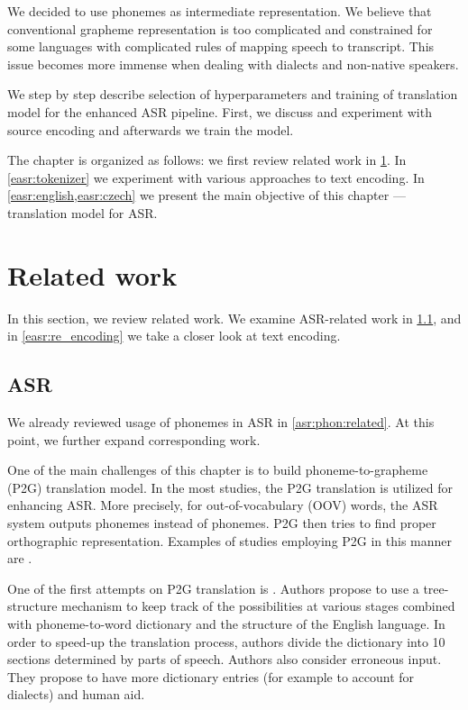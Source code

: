 We decided to use phonemes as intermediate representation. We believe that conventional grapheme representation is too complicated and constrained for some languages with complicated rules of mapping speech to transcript. This issue becomes more immense when dealing with dialects and non-native speakers.

We step by step describe selection of hyperparameters and training of translation model for the enhanced ASR pipeline. First, we discuss and experiment with source encoding and afterwards we train the model.

The chapter is organized as follows: we first review related work in \cref{easr:related}. In \cref{easr:tokenizer} we experiment with various approaches to text encoding. In \cref{easr:english,easr:czech} we present the main objective of this chapter --- translation model for ASR.




\section{Related work}
\label{easr:related}
In this section, we review related work. We examine ASR-related work in \cref{easr:rel_asr}, and in \cref{easr:re_encoding} we take a closer look at text encoding.

\subsection{ASR}
\label{easr:rel_asr}
We already reviewed usage of phonemes in ASR in \cref{asr:phon:related}. At this point, we further expand corresponding work.

One of the main challenges of this chapter is to build phoneme-to-grapheme (P2G) translation model. In the most studies, the P2G translation is utilized for enhancing ASR. More precisely, for out-of-vocabulary (OOV) words, the ASR system outputs phonemes instead of phonemes. P2G then tries to find proper orthographic representation. Examples of studies employing P2G in this manner are .

One of the first attempts on P2G translation is . Authors propose to use a tree-structure mechanism to keep track of the possibilities at various stages combined with phoneme-to-word dictionary and the structure of the English language. In order to speed-up the translation process, authors divide the dictionary into 10 sections determined by parts of speech. Authors also consider erroneous input. They propose to have more dictionary entries (for example to account for dialects) and human aid.

